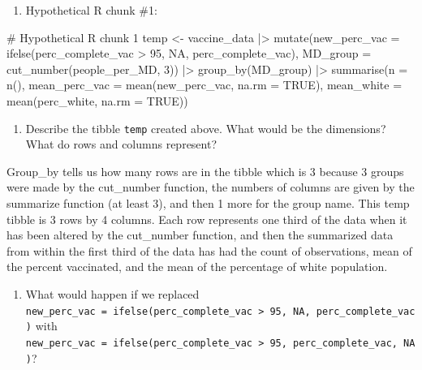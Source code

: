 \documentclass[
  letterpaper,
  DIV=11,
  numbers=noendperiod]{scrartcl}
\newenvironment{Shaded}{\begin{snugshade}}{\end{snugshade}}
\newcommand{\AttributeTok}[1]{\textcolor[rgb]{0.40,0.45,0.13}{#1}}
\newcommand{\CommentTok}[1]{\textcolor[rgb]{0.37,0.37,0.37}{#1}}
\newcommand{\ConstantTok}[1]{\textcolor[rgb]{0.56,0.35,0.01}{#1}}
\newcommand{\DecValTok}[1]{\textcolor[rgb]{0.68,0.00,0.00}{#1}}
\newcommand{\FunctionTok}[1]{\textcolor[rgb]{0.28,0.35,0.67}{#1}}
\newcommand{\NormalTok}[1]{\textcolor[rgb]{0.00,0.23,0.31}{#1}}
\newcommand{\OtherTok}[1]{\textcolor[rgb]{0.00,0.23,0.31}{#1}}
\newcommand{\SpecialCharTok}[1]{\textcolor[rgb]{0.37,0.37,0.37}{#1}}
\providecommand{\tightlist}{%
  \setlength{\itemsep}{0pt}\setlength{\parskip}{0pt}}
\begin{document}
\begin{enumerate}
\def\labelenumi{\arabic{enumi}.}
\setcounter{enumi}{7}
\tightlist
\item
  Hypothetical R chunk \#1:
\end{enumerate}

\begin{Shaded}
\begin{Highlighting}[]
\CommentTok{\# Hypothetical R chunk 1}
\NormalTok{temp }\OtherTok{\textless{}{-}}\NormalTok{ vaccine\_data }\SpecialCharTok{|\textgreater{}}
  \FunctionTok{mutate}\NormalTok{(}\AttributeTok{new\_perc\_vac =} \FunctionTok{ifelse}\NormalTok{(perc\_complete\_vac }\SpecialCharTok{\textgreater{}} \DecValTok{95}\NormalTok{, }\ConstantTok{NA}\NormalTok{, perc\_complete\_vac),}
         \AttributeTok{MD\_group =} \FunctionTok{cut\_number}\NormalTok{(people\_per\_MD, }\DecValTok{3}\NormalTok{)) }\SpecialCharTok{|\textgreater{}}
  \FunctionTok{group\_by}\NormalTok{(MD\_group) }\SpecialCharTok{|\textgreater{}}
  \FunctionTok{summarise}\NormalTok{(}\AttributeTok{n =} \FunctionTok{n}\NormalTok{(),}
            \AttributeTok{mean\_perc\_vac =} \FunctionTok{mean}\NormalTok{(new\_perc\_vac, }\AttributeTok{na.rm =} \ConstantTok{TRUE}\NormalTok{),}
            \AttributeTok{mean\_white =} \FunctionTok{mean}\NormalTok{(perc\_white, }\AttributeTok{na.rm =} \ConstantTok{TRUE}\NormalTok{))}
\end{Highlighting}
\end{Shaded}

\begin{enumerate}
\def\labelenumi{\alph{enumi})}
\tightlist
\item
  Describe the tibble \texttt{temp} created above. What would be the
  dimensions? What do rows and columns represent?
\end{enumerate}

Group\_by tells us how many rows are in the tibble which is 3 because 3
groups were made by the cut\_number function, the numbers of columns are
given by the summarize function (at least 3), and then 1 more for the
group name. This temp tibble is 3 rows by 4 columns. Each row represents
one third of the data when it has been altered by the cut\_number
function, and then the summarized data from within the first third of
the data has had the count of observations, mean of the percent
vaccinated, and the mean of the percentage of white population.

\begin{enumerate}
\def\labelenumi{\alph{enumi})}
\setcounter{enumi}{1}
\tightlist
\item
  What would happen if we replaced
  \texttt{new\_perc\_vac\ =\ ifelse(perc\_complete\_vac\ \textgreater{}\ 95,\ NA,\ perc\_complete\_vac)}
  with
  \texttt{new\_perc\_vac\ =\ ifelse(perc\_complete\_vac\ \textgreater{}\ 95,\ perc\_complete\_vac,\ NA)}?
\end{enumerate}
\end{document}
